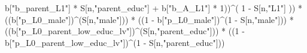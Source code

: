 \documentclass[
]{book}
\newenvironment{Shaded}{\begin{snugshade}}{\end{snugshade}}
\newcommand{\DecValTok}[1]{\textcolor[rgb]{0.00,0.00,0.81}{#1}}
\newcommand{\NormalTok}[1]{#1}
\newcommand{\SpecialCharTok}[1]{\textcolor[rgb]{0.00,0.00,0.00}{#1}}
\newcommand{\StringTok}[1]{\textcolor[rgb]{0.31,0.60,0.02}{#1}}
\begin{document}
\begin{Shaded}
\begin{Highlighting}[]
\NormalTok{                 b[}\StringTok{"b\_parent\_L1"}\NormalTok{] }\SpecialCharTok{*}\NormalTok{ S[n,}\StringTok{"parent\_educ"}\NormalTok{] }\SpecialCharTok{+}
\NormalTok{                 b[}\StringTok{"b\_A\_L1"}\NormalTok{] }\SpecialCharTok{*} \DecValTok{1}\NormalTok{))}\SpecialCharTok{\^{}}\NormalTok{( }\DecValTok{1} \SpecialCharTok{{-}}\NormalTok{ S[n,}\StringTok{"L1"}\NormalTok{] )) }\SpecialCharTok{*}
\NormalTok{      ((b[}\StringTok{"p\_L0\_male"}\NormalTok{])}\SpecialCharTok{\^{}}\NormalTok{(S[n,}\StringTok{"male"}\NormalTok{])) }\SpecialCharTok{*} 
\NormalTok{      ((}\DecValTok{1} \SpecialCharTok{{-}}\NormalTok{ b[}\StringTok{"p\_L0\_male"}\NormalTok{])}\SpecialCharTok{\^{}}\NormalTok{(}\DecValTok{1} \SpecialCharTok{{-}}\NormalTok{ S[n,}\StringTok{"male"}\NormalTok{])) }\SpecialCharTok{*} 
\NormalTok{      ((b[}\StringTok{"p\_L0\_parent\_low\_educ\_lv"}\NormalTok{])}\SpecialCharTok{\^{}}\NormalTok{(S[n,}\StringTok{"parent\_educ"}\NormalTok{])) }\SpecialCharTok{*}
\NormalTok{      ((}\DecValTok{1} \SpecialCharTok{{-}}\NormalTok{ b[}\StringTok{"p\_L0\_parent\_low\_educ\_lv"}\NormalTok{])}\SpecialCharTok{\^{}}\NormalTok{(}\DecValTok{1} \SpecialCharTok{{-}}\NormalTok{ S[n,}\StringTok{"parent\_educ"}\NormalTok{])) }
    

\end{Highlighting}
\end{Shaded}
\end{document}
